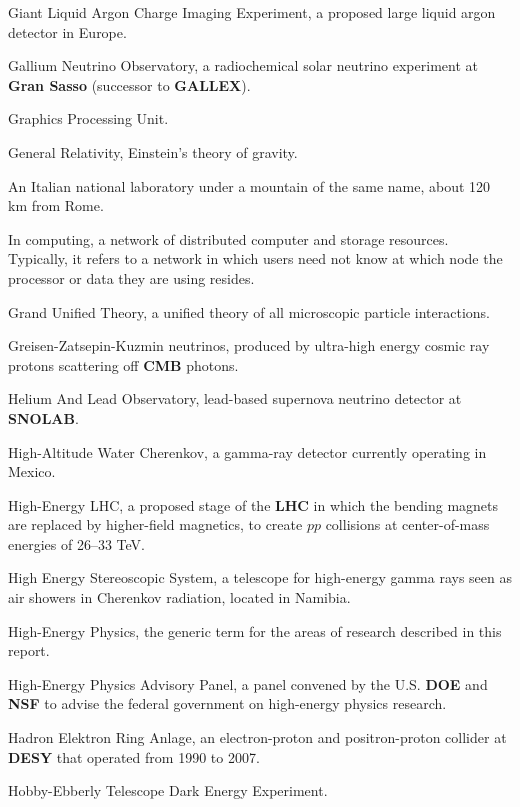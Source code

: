 Giant Liquid Argon Charge Imaging Experiment, a
proposed large liquid argon detector in Europe.

 Gallium Neutrino Observatory, a radiochemical solar neutrino
experiment at {\bf Gran Sasso} (successor to {\bf GALLEX}).

   Graphics Processing Unit.

  General Relativity, Einstein's theory of gravity.

 An Italian national laboratory under a mountain of the
same name, about 120 km from Rome.

  In computing, a network of distributed computer and 
                    storage resources.   Typically, it refers to a network
                    in which users need not know at which node the
                    processor or data they are using resides.

 Grand Unified Theory, a unified theory of all microscopic
particle interactions.

  Greisen-Zatsepin-Kuzmin neutrinos, produced by
ultra-high energy cosmic ray protons scattering off {\bf CMB} photons.

 Helium And Lead Observatory, lead-based supernova neutrino
detector at {\bf SNOLAB}.

  High-Altitude Water Cherenkov, a gamma-ray detector currently
operating in Mexico.

  High-Energy LHC, a proposed stage of the {\bf LHC} in which the
bending magnets are replaced by higher-field magnetics, to create $pp$
collisions
at center-of-mass energies of 26--33 TeV.

 High Energy Stereoscopic System, a telescope for
high-energy gamma rays seen as air showers in Cherenkov radiation, located
in Namibia.

 High-Energy Physics, the generic term for the areas of
research described in this report.

 High-Energy Physics Advisory Panel, a panel convened
by the U.S. {\bf DOE} and {\bf NSF} to advise the federal government
on high-energy physics research.

 Hadron Elektron Ring Anlage, an electron-proton and
positron-proton collider at {\bf DESY} that operated from 1990 to 2007. 

  Hobby-Ebberly Telescope Dark Energy Experiment.
    

